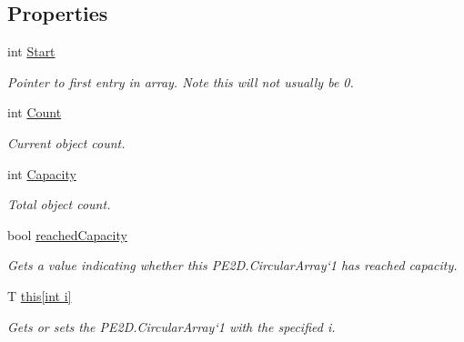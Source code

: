 \subsection*{Properties}
\begin{DoxyCompactItemize}
\item 
int \hyperlink{class_p_e2_d_1_1_circular_array_a120928cf093724ec2a4edef5c2424469}{Start}
\begin{DoxyCompactList}\small\item\em Pointer to first entry in array. Note this will not usually be 0. \end{DoxyCompactList}\item 
int \hyperlink{class_p_e2_d_1_1_circular_array_a7719268e9e7c8ae1c7e738d6b1e8b56f}{Count}
\begin{DoxyCompactList}\small\item\em Current object count. \end{DoxyCompactList}\item 
int \hyperlink{class_p_e2_d_1_1_circular_array_a438059cd335ad0b7ca726cc43457b4c2}{Capacity}
\begin{DoxyCompactList}\small\item\em Total object count. \end{DoxyCompactList}\item 
bool \hyperlink{class_p_e2_d_1_1_circular_array_a570cb7b0d5c6a0e5975ec498c6b01603}{reached\+Capacity}
\begin{DoxyCompactList}\small\item\em Gets a value indicating whether this P\+E2\+D.\+Circular\+Array`1 has reached capacity. \end{DoxyCompactList}\item 
T \hyperlink{class_p_e2_d_1_1_circular_array_abdeb1c16da88d4b2d96b72ec725e7c2e}{this\mbox{[}int i\mbox{]}}
\begin{DoxyCompactList}\small\item\em Gets or sets the P\+E2\+D.\+Circular\+Array`1 with the specified i. \end{DoxyCompactList}\end{DoxyCompactItemize}


